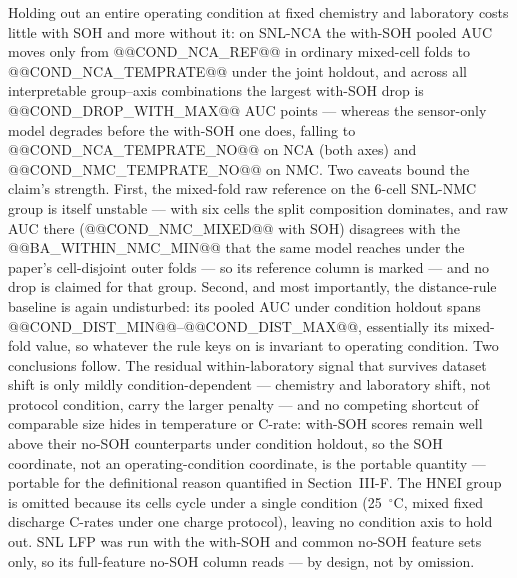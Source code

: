 Holding out an entire operating condition at fixed chemistry and laboratory costs little with SOH and more without it: on SNL-NCA the with-SOH pooled AUC moves only from @@COND_NCA_REF@@ in ordinary mixed-cell folds to @@COND_NCA_TEMPRATE@@ under the joint holdout, and across all interpretable group--axis combinations the largest with-SOH drop is @@COND_DROP_WITH_MAX@@ AUC points --- whereas the sensor-only model degrades before the with-SOH one does, falling to @@COND_NCA_TEMPRATE_NO@@ on NCA (both axes) and @@COND_NMC_TEMPRATE_NO@@ on NMC. Two caveats bound the claim's strength. First, the mixed-fold raw reference on the 6-cell SNL-NMC group is itself unstable --- with six cells the split composition dominates, and raw AUC there (@@COND_NMC_MIXED@@ with SOH) disagrees with the @@BA_WITHIN_NMC_MIN@@ that the same model reaches under the paper's cell-disjoint outer folds --- so its reference column is marked --- and no drop is claimed for that group. Second, and most importantly, the distance-rule baseline is again undisturbed: its pooled AUC under condition holdout spans @@COND_DIST_MIN@@--@@COND_DIST_MAX@@, essentially its mixed-fold value, so whatever the rule keys on is invariant to operating condition. Two conclusions follow. The residual within-laboratory signal that survives dataset shift is only mildly condition-dependent --- chemistry and laboratory shift, not protocol condition, carry the larger penalty --- and no competing shortcut of comparable size hides in temperature or C-rate: with-SOH scores remain well above their no-SOH counterparts under condition holdout, so the SOH coordinate, not an operating-condition coordinate, is the portable quantity --- portable for the definitional reason quantified in Section~III-F. The HNEI group is omitted because its cells cycle under a single condition (25~$^\circ$C, mixed fixed discharge C-rates under one charge protocol), leaving no condition axis to hold out. SNL LFP was run with the with-SOH and common no-SOH feature sets only, so its full-feature no-SOH column reads --- by design, not by omission.

